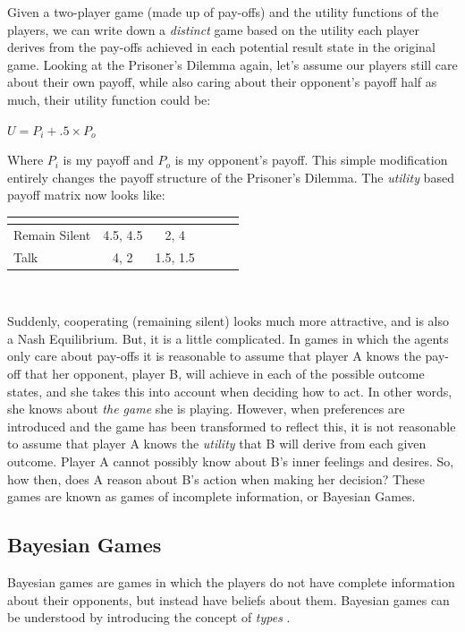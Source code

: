 \documentclass[11pt]{book}
\newcommand*{\np}{\par\noindent\newline}
\begin{document}
\np Given a two-player game (made up of pay-offs) and the utility functions of the players, we can write down a \textit{distinct} game based on the utility each player derives from the pay-offs achieved in each potential result state in the original game. 
Looking at the Prisoner's Dilemma again, let's assume our players still care about their own payoff, while also caring about their opponent's payoff half as much, their utility function could be:
\begin{center}
\(U = P_i + .5 \times P_o\) 
\end{center}
Where $P_i$ is my payoff and $P_o$ is my opponent's payoff.
This simple modification entirely changes the payoff structure of the Prisoner's Dilemma. 
The \textit{utility} based payoff matrix now looks like:
\begin{center}
	\begin{tabular}{|l||*{5}{c|}}\hline
		\label{utility_prisoner}
		\backslashbox{Prisoner A}{Prisoner B}
		&\makebox[7em]{Remain Silent}&\makebox[7em]{Talk}\\\hline\hline
		Remain Silent & 4.5, 4.5 & 2, 4\\\hline
		Talk & 4, 2 & 1.5, 1.5 \\\hline
		\end{tabular}
 \end{center}\mbox{}\\
\np Suddenly, cooperating (remaining silent) looks much more attractive, and is
also a Nash Equilibrium. But, it is a little complicated. In games in which the
agents only care about pay-offs it is reasonable to assume that player A knows
the pay-off that her opponent, player B, will achieve in each of the possible
outcome states, and she takes this into account when deciding how to act. In
other words, she knows about \textit{the game} she is playing. However, when
preferences are introduced and the game has been transformed to reflect this,
it is not reasonable to assume that player A knows the \textit{utility} that B
will derive from each given outcome. Player A cannot possibly know about B's
inner feelings and desires. So, how then, does A reason about B's action when
making her decision? 
These games are known as games of incomplete information, or Bayesian Games.

\subsection{Bayesian Games}\label{bayesian_games}
Bayesian games are games in which the players do not have complete information about their opponents, but instead have beliefs about them.
Bayesian games can be understood by introducing the concept of \textit{types} \citep[~p. 167]{shoham_multiagent_2008}. 
\end{document}
